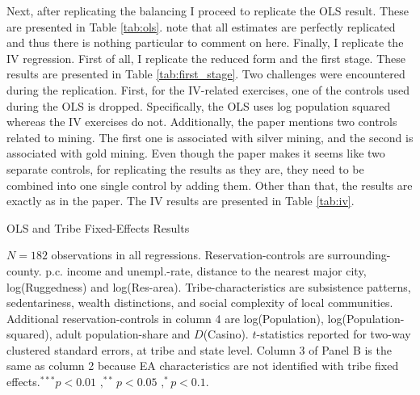 Next, after replicating the balancing I proceed to replicate the OLS result. These are presented in Table \ref{tab:ols}. note that all estimates are perfectly replicated and thus there is nothing particular to comment on here. Finally, I replicate the IV regression. First of all, I replicate the reduced form and the first stage. These results are presented in Table \ref{tab:first_stage}. Two challenges were encountered during the replication. First, for the IV-related exercises, one of the controls used during the OLS is dropped. Specifically, the OLS uses log population squared whereas the IV exercises do not. Additionally, the paper mentions two controls related to mining. The first one is associated with silver mining, and the second is associated with gold mining. Even though the paper makes it seems like two separate controls, for replicating the results as they are, they need to be combined into one single control by adding them. Other than that, the results are exactly as in the paper. The IV results are presented in Table \ref{tab:iv}.
\begin{table}[htb]
    \caption{\sc OLS and Tribe Fixed-Effects Results}
    \label{tab:ols}
    \vspace{-15pt}
    
    \vspace{-10pt}
    \footnotesize{$N = 182$ observations in all regressions. Reservation-controls are surrounding-county. p.c. income and unempl.-rate, distance to the nearest major city, log(Ruggedness) and log(Res-area). Tribe-characteristics are subsistence patterns, sedentariness, wealth distinctions, and social complexity of local communities. Additional reservation-controls in column 4 are log(Population), log(Population-squared), adult population-share and $D$(Casino). $t$-statistics reported for two-way clustered standard errors, at tribe and state level. Column 3 of Panel B is the same as column 2 because EA characteristics are not identified with tribe fixed effects$.^{***}p<0.01$ $,^{**} p<0.05$ $,^* p<0.1$.}
\end{table}




